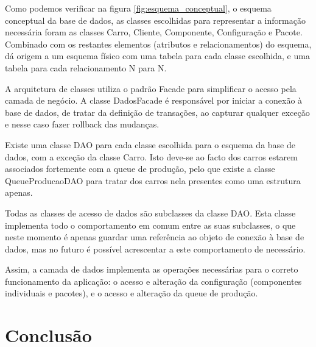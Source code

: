 \documentclass{llncs}
\begin{document}
Como podemos verificar na figura \ref{fig:esquema_conceptual}, o esquema conceptual da base de dados, as classes escolhidas para representar a informação necessária foram as classes Carro, Cliente, Componente, Configuração e Pacote. Combinado com os restantes elementos (atributos e relacionamentos) do esquema, dá origem a um esquema físico com uma tabela para cada classe escolhida, e uma tabela para cada relacionamento N para N.

A arquitetura de classes utiliza o padrão Facade para simplificar o acesso pela camada de negócio. A classe DadosFacade é responsável por iniciar a conexão à base de dados, de tratar da definição de transações, ao capturar qualquer exceção e nesse caso fazer rollback das mudanças.

Existe uma classe DAO para cada classe escolhida para o esquema da base de dados, com a exceção da classe Carro. Isto deve-se ao facto dos carros estarem associados fortemente com a queue de produção, pelo que existe a classe QueueProducaoDAO para tratar dos carros nela presentes como uma estrutura apenas.

Todas as classes de acesso de dados são subclasses da classe DAO. Esta classe implementa todo o comportamento em comum entre as suas subclasses, o que neste momento é apenas guardar uma referência ao objeto de conexão à base de dados, mas no futuro é possível acrescentar a este comportamento de necessário.

Assim, a camada de dados implementa as operações necessárias para o correto funcionamento da aplicação: o acesso e alteração da configuração (componentes individuais e pacotes), e o acesso e alteração da queue de produção.

\clearpage
\section{Conclusão}
\end{document}
